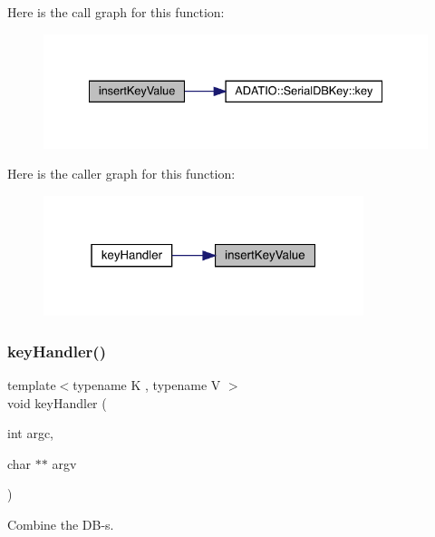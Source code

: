 Here is the call graph for this function\+:
\nopagebreak
\begin{figure}[H]
\begin{center}
\leavevmode
\includegraphics[width=334pt]{d5/d98/adat-devel_2main_2dbutil_2dbavg_8cc_a8dcef9d29a9dfc5045f4ee378e94fca3_cgraph}
\end{center}
\end{figure}
Here is the caller graph for this function\+:
\nopagebreak
\begin{figure}[H]
\begin{center}
\leavevmode
\includegraphics[width=265pt]{d5/d98/adat-devel_2main_2dbutil_2dbavg_8cc_a8dcef9d29a9dfc5045f4ee378e94fca3_icgraph}
\end{center}
\end{figure}
\mbox{\label{adat-devel_2main_2dbutil_2dbavg_8cc_a57918e290614430413950cb4fdfd967e}} 
\subsubsection{\texorpdfstring{keyHandler()}{keyHandler()}}
{\footnotesize\ttfamily template$<$typename K , typename V $>$ \\
void key\+Handler (\begin{DoxyParamCaption}\item[{int}]{argc,  }\item[{char $\ast$$\ast$}]{argv }\end{DoxyParamCaption})}



Combine the D\+B-\/s. 

